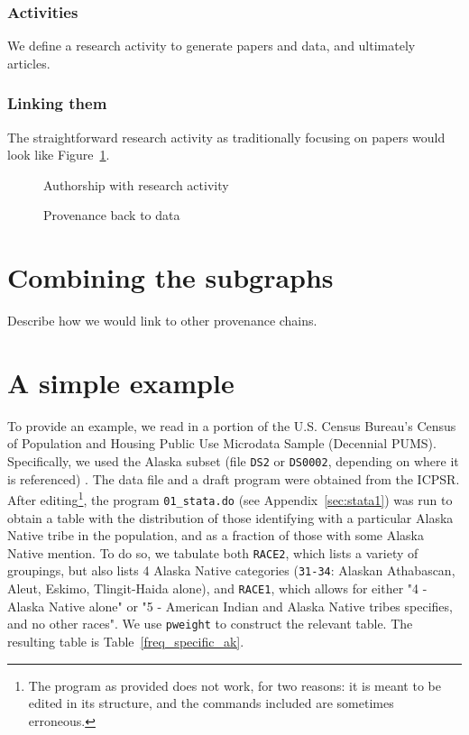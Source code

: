 \documentclass[x11names]{article}
\begin{document}
\subsubsection*{Activities}
We define a research activity to generate papers and data, and ultimately articles.


\subsubsection*{Linking them}


The straightforward research activity as traditionally focusing on papers would look like  
Figure~\ref{fig:author:complex}.
\begin{figure}
\caption{Authorship with research activity}\label{fig:author:complex}

\end{figure}

\begin{figure}
\caption{Provenance back to data}\label{fig:workflow:complex}

\end{figure}


\section{Combining the subgraphs}
\label{sec:combine}

Describe how we would link to other provenance chains.

\clearpage

\section{A simple example}
\label{sec:example}

To provide an example, we read in a portion of the U.S. Census Bureau's Census of Population 
and Housing Public Use Microdata Sample (Decennial PUMS). Specifically, we used the Alaska 
subset (file \texttt{DS2} or \texttt{DS0002}, depending on where it is referenced) \cite{pumsak}. 
The data file and a draft program  were obtained from the \ac{ICPSR}. After 
editing\footnote{The program as provided does not work, for two reasons: it is meant to be 
edited in its structure, and the commands included are sometimes erroneous.}, the program 
\texttt{01\_stata.do} (see Appendix~\ref{sec:stata1}) 
was run to obtain a table with the distribution of those identifying with a particular Alaska Native 
tribe in the population, and as a fraction of those with some Alaska Native mention. To do so, we 
tabulate both \texttt{RACE2}, which lists a variety of groupings, but also lists 4 Alaska Native 
categories (\texttt{31-34}: Alaskan Athabascan, Aleut, Eskimo, Tlingit-Haida alone), and 
\texttt{RACE1}, which allows for either "4 - Alaska Native alone" or 
"5 - American Indian and Alaska Native tribes specifies, and no other races".  We use 
\texttt{pweight} to construct the relevant table. The resulting table is Table~\ref{freq_specific_ak}.
\end{document}
